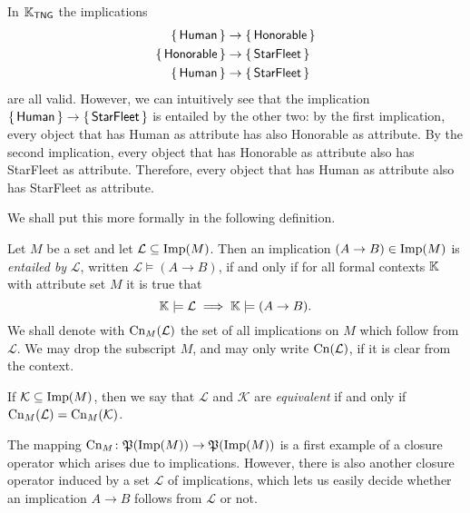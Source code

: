 \begin{Example}
  \label{expl:7}
  In ${\mathbb{K}}_{\mathsf{TNG}}$ the implications
  \begin{align*}
    {\ensuremath{\{\, \mathsf{Human} \,\}}} &\to {\ensuremath{\{\, \mathsf{Honorable} \,\}}} \\
    {\{\, \mathsf{Honorable} \,\}} &\to {\ensuremath{\{\, \mathsf{StarFleet} \,\}}} \\
    {\{\, \mathsf{Human} \,\}} &\to {\ensuremath{\{\, \mathsf{StarFleet} \,\}}}
  \end{align*}
  are all valid.  However, we can intuitively see that the implication ${\{\,
    \mathsf{Human} \,\}} \to {\ensuremath{\{\, \mathsf{StarFleet} \,\}}}$ is entailed by the other two: by the
  first implication, every object that has \textsf{Human} as attribute has also
  \textsf{Honorable} as attribute.  By the second implication, every object that has
  \textsf{Honorable} as attribute also has \textsf{StarFleet} as attribute.  Therefore,
  every object that has \textsf{Human} as attribute also has \textsf{StarFleet} as
  attribute.
\end{Example}

We shall put this more formally in the following definition.

\begin{Definition}
  \label{def:entailment-between-implications}
  Let $M$ be a set and let $\mathcal{L} \subseteq \operatorname{Imp}(M)$.  Then an implication $(A \to
  B) \in \operatorname{Imp}(M)$ is \emph{entailed by} $\mathcal{L}$, written $\mathcal{L} \models (A \to
  B)$, if and only if for all formal contexts ${\mathbb{K}}$ with attribute set $M$ it is true that
  \begin{equation*}
    {\ensuremath{\mathbb{K}}} \models \mathcal{L} \implies {\ensuremath{\mathbb{K}}} \models (A \to B).
  \end{equation*}
  We shall denote with $\operatorname{Cn}_M(\mathcal{L})$ the set of all implications on $M$ which
  follow from $\mathcal{L}$.  We may drop the subscript $M$, and may only write
  $\operatorname{Cn}(\mathcal{L})$, if it is clear from the context.

  If $\mathcal{K} \subseteq \operatorname{Imp}(M)$, then we say that $\mathcal{L}$ and $\mathcal{K}$ are
  \emph{equivalent} if and only if $\operatorname{Cn}_M(\mathcal{L}) = \operatorname{Cn}_M(\mathcal{K})$.
\end{Definition}

The mapping $\operatorname{Cn}_M \colon {\ensuremath{\mathfrak{P}(\operatorname{Imp}(M))}} \to {\ensuremath{\mathfrak{P}(\operatorname{Imp}(M))}}$ is a first example of a
closure operator which arises due to implications.  However, there is also another closure
operator induced by a set $\mathcal{L}$ of implications, which lets us easily decide
whether an implication $A \to B$ follows from $\mathcal{L}$ or not.

